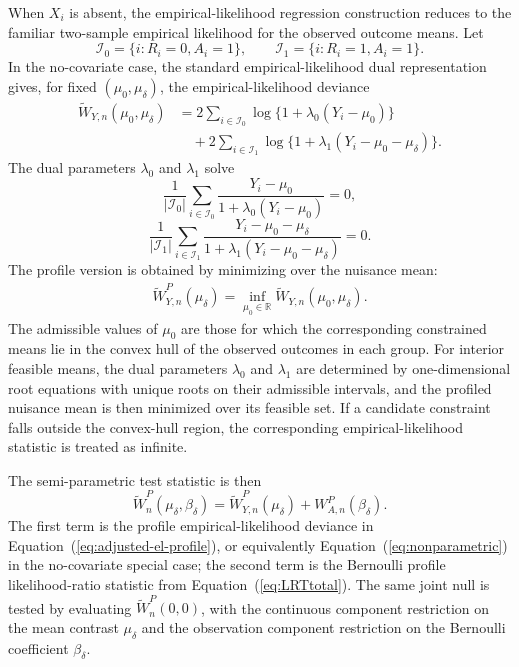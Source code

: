 \documentclass[11pt]{article}
\begin{document}
When $X_i$ is absent, the empirical-likelihood regression construction reduces to the familiar two-sample empirical likelihood for the observed outcome means. Let
\[
\mathcal{I}_0 = \{i:R_i = 0, A_i = 1\},
\qquad
\mathcal{I}_1 = \{i:R_i = 1, A_i = 1\}.
\]
In the no-covariate case, the standard empirical-likelihood dual representation gives, for fixed $(\mu_0,\mu_\delta)$, the empirical-likelihood deviance
\begin{align}
  \widetilde{W}_{Y,n}(\mu_0,\mu_\delta)
  &=2\sum_{i\in\mathcal{I}_0}
    \log\{1+\lambda_0(Y_i-\mu_0)\}\nonumber\\
  &\quad+2\sum_{i\in\mathcal{I}_1}
    \log\{1+\lambda_1(Y_i-\mu_0-\mu_\delta)\}.\label{eq:nonparametric}
\end{align}
The dual parameters $\lambda_0$ and $\lambda_1$ solve
\[
\frac{1}{|\mathcal{I}_0|}\sum_{i\in\mathcal{I}_0}
\frac{Y_i-\mu_0}{1+\lambda_0(Y_i-\mu_0)}=0,
\]
\[
\frac{1}{|\mathcal{I}_1|}\sum_{i\in\mathcal{I}_1}
\frac{Y_i-\mu_0-\mu_\delta}{1+\lambda_1(Y_i-\mu_0-\mu_\delta)}=0.
\]
The profile version is obtained by minimizing over the nuisance mean:
\begin{align*}
  \widetilde{W}_{Y,n}^P(\mu_\delta) = \inf_{\mu_0 \in \mathbb{R}} \widetilde{W}_{Y,n}(\mu_0,\mu_\delta).
\end{align*}
The admissible values of $\mu_0$ are those for which the corresponding constrained means lie in the convex hull of the observed outcomes in each group. For interior feasible means, the dual parameters $\lambda_0$ and $\lambda_1$ are determined by one-dimensional root equations with unique roots on their admissible intervals, and the profiled nuisance mean is then minimized over its feasible set. If a candidate constraint falls outside the convex-hull region, the corresponding empirical-likelihood statistic is treated as infinite.

The semi-parametric test statistic is then
\begin{equation}
  \widetilde{W}_n^P(\mu_\delta, \beta_\delta)
  = \widetilde{W}_{Y,n}^P(\mu_\delta) + W_{A,n}^P(\beta_\delta).\label{eq:LRT_SP_total}
\end{equation}
The first term is the profile empirical-likelihood deviance in Equation~(\ref{eq:adjusted-el-profile}), or equivalently Equation~(\ref{eq:nonparametric}) in the no-covariate special case; the second term is the Bernoulli profile likelihood-ratio statistic from Equation~(\ref{eq:LRTtotal}). The same joint null is tested by evaluating $\widetilde{W}_n^P(0,0)$, with the continuous component restriction on the mean contrast $\mu_\delta$ and the observation component restriction on the Bernoulli coefficient $\beta_\delta$.
\end{document}

